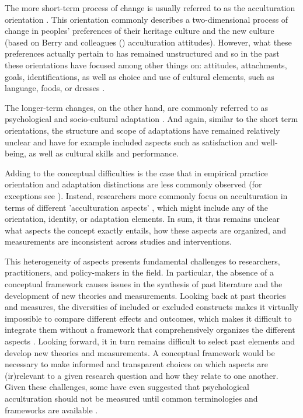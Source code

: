 \documentclass[nobib]{tufte-handout}
\begin{document}
The more short-term process of change is usually referred to as the acculturation orientation \citep[e.g.,][]{Ward2001, Berry2003}. This orientation commonly describes a two-dimensional process of change in peoples' preferences of their heritage culture and the new culture (based on Berry and colleagues (\citeyear{Berry1997b, Berry2003}) acculturation attitudes). However, what these preferences actually pertain to has remained unstructured and so in the past these orientations have focused among other things on: attitudes, attachments, goals, identifications, as well as choice and use of cultural elements, such as language, foods, or dresses \citep[e.g.,][]{Rudmin2003a}. 

The longer-term changes, on the other hand, are commonly referred to as psychological and socio-cultural adaptation \citep{Searle1990, Ward2001, Berry2003}. And again, similar to the short term orientations, the structure and scope of adaptations have remained relatively unclear and have for example included aspects such as satisfaction and well-being, as well as cultural skills and performance. 

Adding to the conceptual difficulties is the case that in empirical practice orientation and adaptation distinctions are less commonly observed (for exceptions see \citealp{ICSEYteam2006, Berry2006b, TeLindert2008a}). Instead, researchers more commonly focus on acculturation in terms of different 'acculturation aspects' \citep{Arends-Toth2006a}, which might include any of the orientation, identity, or adaptation elements. In sum, it thus remains unclear what aspects the concept exactly entails, how these aspects are organized, and measurements are inconsistent across studies and interventions.

This heterogeneity of aspects presents fundamental challenges to researchers, practitioners, and policy-makers in the field. In particular, the absence of a conceptual framework causes issues in the synthesis of past literature and the development of new theories and measurements.
Looking back at past theories and measures, the diversities of included or excluded constructs makes it virtually impossible to compare different effects and outcomes, which makes it difficult to integrate them without a framework that comprehensively organizes the different aspects \citep{Taft1981}.
Looking forward, it in turn remains difficult to select past elements and develop new theories and measurements. A conceptual framework would be necessary to make informed and transparent choices on which aspects are (ir)relevant to a given research question and how they relate to one another.
Given these challenges, some have even suggested that psychological acculturation should not be measured until common terminologies and frameworks are available \citep{Escobar2000}.
\end{document}
